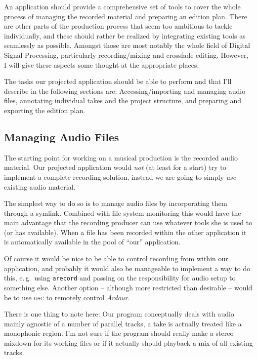 \documentclass[11pt,a4paper]{article}
\begin{document}
An application should provide a comprehensive set of tools to cover the whole process of managing the recorded material and preparing an edition plan.
There are other parts of the production process that seem too ambitious to tackle individually, and these should rather be realized by integrating existing tools as seamlessly as possible.
Amongst those are most notably the whole field of Digital Signal Processing, particularly recording/mixing and crossfade editing.
However, I will give these aspects some thought at the appropriate places.

The tasks our projected application should be able to perform and that I'll describe in the following sections are:
Accessing/importing and managing audio files,
annotating individual takes and the project structure, and
preparing and exporting the edition plan.

\subsection{Managing Audio Files}

The starting point for working on a musical production is the recorded audio material.
Our projected application would \emph{not} (at least for a start) try to implement a complete recording solution, instead we are going to simply \emph{use} existing audio material.

The simplest way to do so is to manage audio files by incorporating them through a symlink.
Combined with file system monitoring this would have the main advantage that the recording producer can use whatever tools she is used to (or has available).
When a file has been recorded within the other application it is automatically available in the pool of “our” application.

Of course it would be nice to be able to control recording from within our application, and probably it would also be manageable to implement a way to do this, e.\,g.\ using \texttt{arecord} and passing on the responsibility for audio setup to something else.
Another option -- although more restricted than desirable -- would be to use \textsc{osc} to remotely control \emph{Ardour}.

There is one thing to note here: Our program conceptually deals with audio mainly agnostic of a number of parallel tracks, a take is actually treated like a monophonic region.
I'm not sure if the program should really make a stereo mixdown for its working files or if it actually should playback a mix of all existing tracks.
\end{document}
